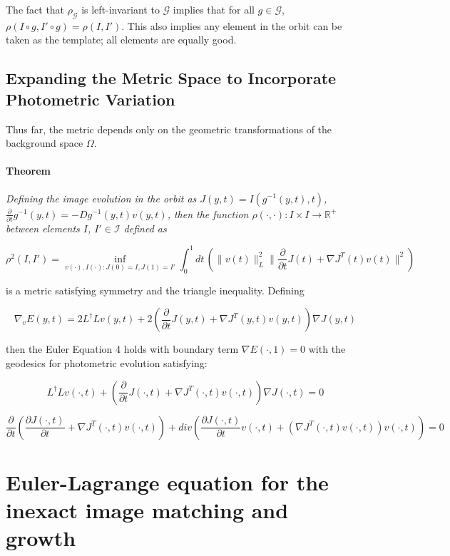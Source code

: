 \documentclass[final, paper=letter,5p,times,twocolumn]{elsarticle}
\theoremstyle{definition}
\begin{document}
The fact that $\rho_{\mathcal{G}}$ is left-invariant to $\mathcal{G}$ implies that for all $g \in \mathcal{G}$, $\rho(I \circ g, I' \circ g) = ρ(I, I')$. This also implies any element in the orbit can be taken as the template; all elements are equally good.

\subsection{Expanding the Metric Space to Incorporate Photometric Variation}

Thus far, the metric depends only on the geometric transformations of the background space $\Omega$.

\paragraph{Theorem}{\it Defining the image evolution in the orbit as $J(y, t) = I(g^{−1}(y, t), t)$, $\frac{\partial}{\partial t} g^{-1}(y, t) = −Dg^{−1}(y, t)v(y, t)$, then the function $\rho(\cdot, \cdot): I \times I \rightarrow \mathbb{R}^{+}$ between elements $I$, $I' \in \mathcal{I}$ defined as 

$$
\rho^{2}(I,I') = \underset{v(\cdot),I(\cdot):J(0) = I, J(1) = I'}{\inf} \int_{0}^{1} dt \, \left( \| v(t) \|_{L}^{2} \| \frac{\partial }{\partial t} J(t) + \nabla J^{T} (t)v(t)\|^{2} \right)
$$

is a metric satisfying symmetry and the triangle inequality. Defining

$$
\nabla_{v}E(y,t) = 2L^{\dag}Lv(y,t) + 2 \left( \frac{\partial}{\partial t} J(y,t) + \nabla J^{T}(y,t) v(y,t) \right) \nabla J(y,t)
$$

then the Euler Equation 4 holds with boundary term $\nabla E (\cdot, 1) = 0$ with the geodesics for photometric evolution satisfying:

$$
L^{\dag}Lv(\cdot,t) + \left( \frac{\partial}{\partial t} J(\cdot,t) + \nabla J^{T}(\cdot,t) v(\cdot,t) \right) \nabla J(\cdot,t) = 0
$$

$$
\frac{\partial}{\partial t}\left( \frac{\partial J(\cdot,t)}{\partial t} + \nabla J^{T}(\cdot,t) v(\cdot,t) \right) + div\left( \frac{\partial J(\cdot,t)}{\partial t} v(\cdot, t) + (\nabla J^{T}(\cdot,t) v(\cdot,t)) v(\cdot, t) \right) = 0
$$
}

\section{Euler-Lagrange equation for the inexact image matching and growth}
\end{document}
